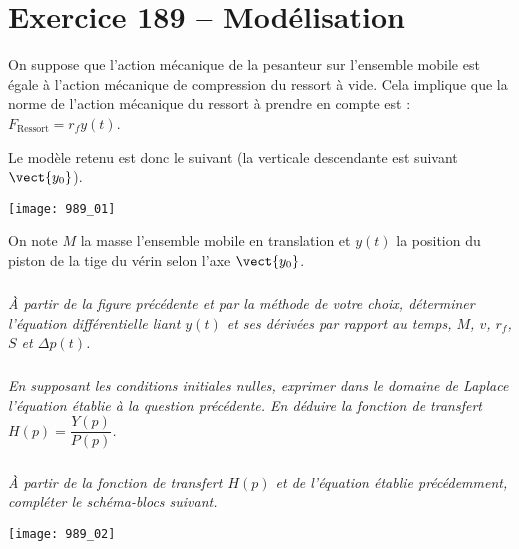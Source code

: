\section*{Exercice 189 -- Modélisation}
\setcounter{exo}{0}


On suppose que l’action mécanique de la pesanteur sur l’ensemble mobile est égale à
l’action mécanique de compression du ressort à vide. Cela implique que la norme de l’action
mécanique du ressort à prendre en compte est : $F_{\text{Ressort}} = r_f y(t)$.

Le modèle retenu est donc le suivant (la verticale descendante est suivant $\vect{y_0}$).


\begin{center}
\texttt{[image: 989\_01]}%
\end{center}

On note $M$ la masse l’ensemble mobile en translation et $y(t)$ la position du piston de la tige du vérin selon l’axe $\vect{y_0}$.




\subparagraph{}
 \textit{À partir de la figure précédente et par la méthode de votre choix, déterminer
l'équation différentielle liant $y(t)$ et ses dérivées par rapport au temps, $M$, $v$, $r_f$, $S$ et $\Delta p(t)$.}
\ifprof
\begin{corrige}
\end{corrige}
\else
\fi

\subparagraph{}
\textit{En supposant les conditions initiales nulles, exprimer dans le domaine de Laplace
l’équation établie à la question précédente. En déduire la fonction de transfert $H(p) = \dfrac{Y(p)}{P(p)}$.}
\ifprof
\begin{corrige}
\end{corrige}
\else
\fi

\subparagraph{}
 \textit{À partir de la fonction de transfert $H(p)$ et de l’équation établie précédemment, compléter le schéma-blocs suivant.}
\ifprof
\begin{corrige}
\end{corrige}
\else
\fi


\begin{center}
\texttt{[image: 989\_02]}%
\end{center}

